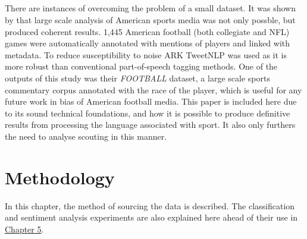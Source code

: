 \documentclass[oneside,12pt]{Classes/RoboticsLaTeX}
\begin{document}
\paragraph{}
There are instances of overcoming the problem of a small dataset. It was shown by \citep{CommentatorBias} that large scale analysis of American sports media was not only possble, 
but produced coherent results. 1,445 American football (both collegiate and NFL) games were automatically annotated with mentions of players and linked with metadata. To reduce
susceptibility to noise ARK TweetNLP was used as it is more robust than conventional part-of-speech tagging methods. One of the outputs of this study was their {\it FOOTBALL} dataset,
a large scale sports commentary corpus annotated with the race of the player, which is useful for any future work in bias of American football media. This paper is included here due to its
sound technical foundations, and how it is possible to produce definitive results from processing the language associated with sport. It also only furthers the need to analyse
scouting in this manner.



\chapter{Methodology}
\label{chap:methodology}
In this chapter, the method of sourcing the data is described. The classification and sentiment analysis experiments are also explained here ahead of their use in \hyperref[chap:experiments]{Chapter 5}.
\end{document}
